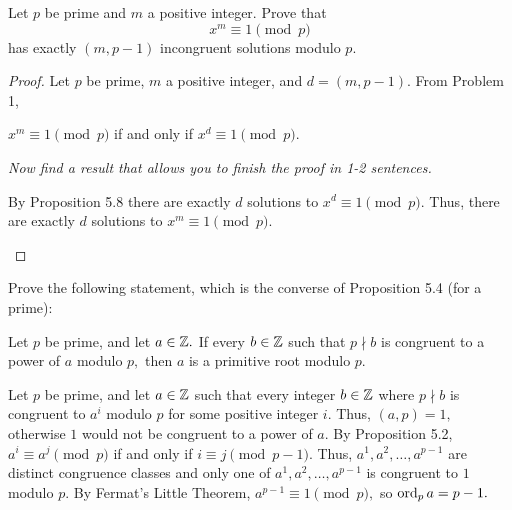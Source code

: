\documentclass[handout,nooutcomes]{ximera}
\begin{document}
\begin{br}
    Let $p$ be prime and $m$ a positive integer. Prove that 
        \[x^m\equiv 1\pmod{p}\]
    has exactly $(m,p-1)$ incongruent solutions modulo $p.$


    \begin{proof}
        Let $p$ be prime, $m$ a positive integer, and $d=(m,p-1).$ 
        From Problem 1,
        \begin{shortAnswer}[\vspace{1in}]
            $x^m\equiv 1\pmod{p}$ if and only if $x^d\equiv 1\pmod{p}$.
        \end{shortAnswer}

            
        \emph{Now find a result that allows you to finish the proof in 1-2 sentences.}

        \begin{shortAnswer}[\vspace{1in}]
            By Proposition 5.8 there are exactly $d$ solutions to $x^d\equiv 1\pmod{p}.$ Thus, there are exactly $d$ solutions to $x^m\equiv 1\pmod{p}.$
        \end{shortAnswer}
    \end{proof}
\end{br}


\begin{br}
    Prove the following statement, which is the converse of Proposition 5.4 (for a prime):

    Let $p$ be prime, and let $a\in\mathbb Z.$ If every $b\in\mathbb Z$ such that $p\nmid b$ is congruent to a power of $a$ modulo $p,$ then ${a}$ is a primitive root modulo $p$.
    
    \begin{solution}
        Let $p$ be prime, and let $a\in\mathbb Z$ such that every integer $b\in\mathbb Z$ where $p\nmid b$ is congruent to $a^i$ modulo $p$ for some positive integer $i$. Thus, $(a,p)=1,$ otherwise $1$ would not be congruent to a power of $a$. By Proposition 5.2, $a^i\equiv a^j\pmod{p}$ if and only if $i\equiv j\pmod{p-1}.$ Thus, $a^1,a^2,\dots,a^{p-1}$ are distinct congruence classes and only one of $a^1,a^2,\dots,a^{p-1}$ is congruent to $1$ modulo $p.$ By Fermat's Little Theorem, $a^{p-1}\equiv1\pmod{p},$ so $\operatorname{ord}_p a=p-1.$
    \end{solution}
\end{br}
\end{document}
